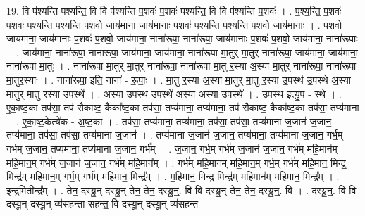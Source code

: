 \documentclass[17pt]{extarticle}
\begin{document}
19. वि प॑श्यन्ति पश्यन्ति॒ वि वि प॑श्यन्ति प॒शवः॑ प॒शवः॑ पश्यन्ति॒ वि वि प॑श्यन्ति प॒शवः॑ । . प॒श्य॒न्ति॒ प॒शवः॑ प॒शवः॑ पश्यन्ति पश्यन्ति प॒शवो॒ जाय॑माना॒ जाय॑मानाः प॒शवः॑ पश्यन्ति पश्यन्ति प॒शवो॒ जाय॑मानाः । . प॒शवो॒ जाय॑माना॒ जाय॑मानाः प॒शवः॑ प॒शवो॒ जाय॑माना॒ नाना॑रूपा॒ नाना॑रूपा॒ जाय॑मानाः प॒शवः॑ प॒शवो॒ जाय॑माना॒ नाना॑रूपाः । . जाय॑माना॒ नाना॑रूपा॒ नाना॑रूपा॒ जाय॑माना॒ जाय॑माना॒ नाना॑रूपा मा॒तुर् मा॒तुर् नाना॑रूपा॒ जाय॑माना॒ जाय॑माना॒ नाना॑रूपा मा॒तुः । . नाना॑रूपा मा॒तुर् मा॒तुर् नाना॑रूपा॒ नाना॑रूपा मा॒तु र॒स्या अ॒स्या मा॒तुर् नाना॑रूपा॒ नाना॑रूपा मा॒तुर॒स्याः । . नाना॑रूपा॒ इति॒ नाना᳚ - रू॒पाः॒ । . मा॒तु र॒स्या अ॒स्या मा॒तुर् मा॒तु र॒स्या उ॒पस्थ॑ उ॒पस्थे॑ अ॒स्या मा॒तुर् मा॒तु र॒स्या उ॒पस्थे᳚ । . अ॒स्या उ॒पस्थ॑ उ॒पस्थे॑ अ॒स्या अ॒स्या उ॒पस्थे᳚ । . उ॒पस्थ॒ इत्यु॒प - स्थे॒ । . ए॒का॒ष्ट॒का तप॑सा॒ तप॑ सैकाष्ट॒ कैका᳚ष्ट॒का तप॑सा॒ तप्य॑माना॒ तप्य॑माना॒ तप॑ सैकाष्ट॒ 
कैका᳚ष्ट॒का तप॑सा॒ तप्य॑माना । . ए॒का॒ष्ट॒केत्ये॑क - अ॒ष्ट॒का । . तप॑सा॒ तप्य॑माना॒ तप्य॑माना॒ तप॑सा॒ तप॑सा॒ तप्य॑माना ज॒जान॑ ज॒जान॒ तप्य॑माना॒ तप॑सा॒ तप॑सा॒ तप्य॑माना ज॒जान॑ । . तप्य॑माना ज॒जान॑ ज॒जान॒ तप्य॑माना॒ तप्य॑माना ज॒जान॒ गर्भ॒म् गर्भ॑म् ज॒जान॒ तप्य॑माना॒ तप्य॑माना ज॒जान॒ गर्भ᳚म् । . ज॒जान॒ गर्भ॒म् गर्भ॑म् ज॒जान॑ ज॒जान॒ गर्भ॑म् महि॒मान॑म् महि॒मान॒म् गर्भ॑म् ज॒जान॑ ज॒जान॒ गर्भ॑म् महि॒मान᳚म् । . गर्भ॑म् महि॒मान॑म् महि॒मान॒म् गर्भ॒म् गर्भ॑म् महि॒मान॒ मिन्द्र॒ मिन्द्र॑म् महि॒मान॒म् गर्भ॒म् गर्भ॑म् महि॒मान॒ मिन्द्र᳚म् । . म॒हि॒मान॒ मिन्द्र॒ मिन्द्र॑म् महि॒मान॑म् महि॒मान॒ मिन्द्र᳚म् । . इन्द्र॒मितीन्द्र᳚म् । . तेन॒ दस्यू॒न् दस्यू॒न् तेन॒ तेन॒ दस्यू॒न्॒. वि वि दस्यू॒न् तेन॒ तेन॒ दस्यू॒न्॒. वि । . दस्यू॒न्॒. वि वि दस्यू॒न् दस्यू॒न् व्य॑सहन्ता सहन्त॒ वि दस्यू॒न् दस्यू॒न् व्य॑सहन्त । \newline
\end{document}
